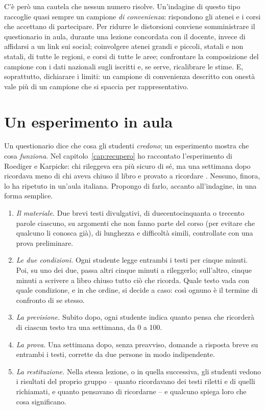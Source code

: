C'è però una cautela che nessun numero risolve. Un'indagine di questo
tipo raccoglie quasi sempre un campione \emph{di convenienza}: rispondono
gli atenei e i corsi che accettano di partecipare. Per ridurre le
distorsioni conviene somministrare il questionario in aula, durante una
lezione concordata con il docente, invece di affidarsi a un link sui
social; coinvolgere atenei grandi e piccoli, statali e non statali, di
tutte le regioni, e corsi di tutte le aree; confrontare la composizione
del campione con i dati nazionali sugli iscritti e, se serve,
ricalibrare le stime. E, soprattutto, dichiarare i limiti: un campione
di convenienza descritto con onestà vale più di un campione che si
spaccia per rappresentativo.

\section{Un esperimento in aula}
\label{sec:indagine-esperimento}

Un questionario dice che cosa gli studenti \emph{credono}; un
esperimento mostra che cosa \emph{funziona}. Nel
capitolo~\ref{cap:recupero} ho raccontato l'esperimento di Roediger e
Karpicke: chi rileggeva era più sicuro di sé, ma una settimana dopo
ricordava meno di chi aveva chiuso il libro e provato a ricordare
\parencite{roediger2006}. Nessuno, finora, lo ha ripetuto in un'aula
italiana. Propongo di farlo, accanto all'indagine, in una forma
semplice.

\begin{enumerate}[leftmargin=1.6em, itemsep=0.2\baselineskip]
  \item \emph{Il materiale.} Due brevi testi divulgativi, di
        duecentocinquanta o trecento parole ciascuno, su argomenti che
        non fanno parte del corso (per evitare che qualcuno li conosca
        già), di lunghezza e difficoltà simili, controllate con una
        prova preliminare.
  \item \emph{Le due condizioni.} Ogni studente legge entrambi i testi
        per cinque minuti. Poi, su uno dei due, passa altri cinque
        minuti a rileggerlo; sull'altro, cinque minuti a scrivere a
        libro chiuso tutto ciò che ricorda. Quale testo vada con quale
        condizione, e in che ordine, si decide a caso: così ognuno è
        il termine di confronto di se stesso.
  \item \emph{La previsione.} Subito dopo, ogni studente indica quanto
        pensa che ricorderà di ciascun testo tra una settimana, da 0 a
        100.
  \item \emph{La prova.} Una settimana dopo, senza preavviso, domande a
        risposta breve su entrambi i testi, corrette da due persone in
        modo indipendente.
  \item \emph{La restituzione.} Nella stessa lezione, o in quella
        successiva, gli studenti vedono i risultati del proprio gruppo
        -- quanto ricordavano dei testi riletti e di quelli richiamati,
        e quanto pensavano di ricordarne -- e qualcuno spiega loro che
        cosa significano.
\end{enumerate}

